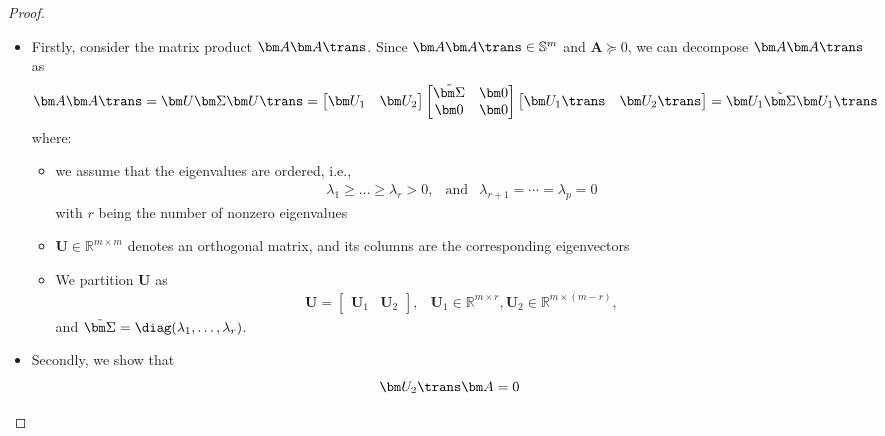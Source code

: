 \begin{proof}
\begin{itemize}
\item
Firstly, consider the matrix product $\bm A\bm A\trans$. Since $\bm A\bm A\trans\in\mathbb{S}^m$ and $\bm A\succeq0$, we can decompose $\bm A\bm A\trans$ as
\begin{equation}\label{Eq:8:9}
\bm A\bm A\trans=\bm U\bm\Sigma\bm U\trans
=\begin{bmatrix}
\bm U_1&\bm U_2
\end{bmatrix}
\begin{bmatrix}
\tilde{\bm\Sigma}&\bm0\\\bm0&\bm0
\end{bmatrix}
\begin{bmatrix}
\bm U_1\trans&\bm U_2\trans
\end{bmatrix}=\bm U_1\tilde{\bm\Sigma}\bm U_1\trans
\end{equation}
where:
\begin{itemize}
\item
we assume that the eigenvalues are ordered, i.e., 
\[
\begin{array}{lll}
\lambda_1\ge\dots\ge\lambda_r>0,
&
\mbox{and}
&
\lambda_{r+1}=\cdots=\lambda_p=0
\end{array}
\]
with $r$ being the number of nonzero eigenvalues
\item
$\bm U\in\mathbb{R}^{m\times m}$ denotes an orthogonal matrix, and its columns are the corresponding eigenvectors
\item
We partition $\bm U$ as
\[
\begin{array}{ll}
\bm U=\begin{bmatrix}
\bm U_1&\bm U_2
\end{bmatrix},
&
\bm U_1\in\mathbb{R}^{m\times r},\bm U_2\in\mathbb{R}^{m\times (m-r)},
\end{array}
\]
and $\tilde{\bm\Sigma}=\diag(\lambda_1,\dots,\lambda_r)$.
\end{itemize}
\item
Secondly, we show that 
\begin{equation}\label{Eq:8:12}
\bm U_2\trans\bm A=0
\end{equation}


\end{itemize}
\end{proof}
